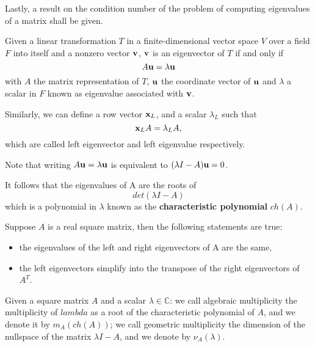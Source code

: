 Lastly, a result on the condition number of the problem
of computing eigenvalues of a matrix shall be given.
\begin{definition}
    Given a linear transformation \(T\) in a finite-dimensional vector space \(V\) over a field \(F\) into itself and a nonzero
    vector
    \(\vb{v}\), \(\vb{v}\) is an eigenvector of \(T\) if and only if
    \[ A \vb{u} = \lambda \vb{u} \]
    with \(A\) the matrix representation of \(T\), \(\vb{u}\) the coordinate vector of \(\vb{u}\) and \(\lambda\) a scalar in
    \(F\) known as eigenvalue associated with \(\vb{v}\).

    Similarly, we can define a row vector \(\vb{x}_{L}\), and a scalar \(\lambda_{L}\) such that
    \[\vb{x}_{L}A = \lambda_{L}A,\]
    which are called left eigenvector and left eigenvalue respectively.
\end{definition}

\begin{remark}
    Note that writing
    \( A \vb{u} = \lambda \vb{u} \) is equivalent to \( (\lambda I - A)\vb{u} = 0 \).

    It follows that the eigenvalues of A are the roots of
    \[ det(\lambda I - A) \]
    which is a polynomial in \(\lambda\) known as the \textbf{characteristic polynomial} \(ch(A)\).
\end{remark}

\begin{remark}
    Suppose \(A\) is a real square matrix, then the following statements are true:
    \begin{itemize}[topsep=0pt, itemsep=0pt, parsep=0pt]
        \item the eigenvalues of the left and right eigenvectors of A are the same,
        \item the left eigenvectors simplify into the transpose of the right eigenvectors of \(A^T\).
    \end{itemize}
\end{remark}

\begin{definition}
    Given a square matrix \(A\) and a scalar \(\lambda \in \mathbb{C}\): we call algebraic multiplicity the multiplicity of \(lambda\) as
    a root of the characteristic polynomial of \(A\), and we denote it by \(m_{A}(ch(A))\); we call geometric multiplicity the
    dimension of the nullspace of the matrix \(\lambda I - A\), and we denote by \(\nu_{A}(\lambda)\).
\end{definition}

